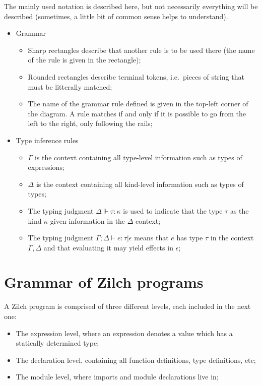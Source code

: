The mainly used notation is described here, but not necessarily everything will be described (sometimes, a little bit of common sense helps to understand).

\begin{itemize}
	\item Grammar
	      \begin{figure}[H]
		      \centering
	      \end{figure}
	      \begin{itemize}
		      \item Sharp rectangles describe that another rule is to be used there (the name of the rule is given in the rectangle);
		      \item Rounded rectangles describe terminal tokens, i.e.\ pieces of string that must be litterally matched;
		      \item The name of the grammar rule defined is given in the top-left corner of the diagram.
		            A rule matches if and only if it is possible to go from the left to the right, only following the rails;
	      \end{itemize}
	\item Type inference rules
	      \begin{itemize}
		      \item $\Gamma$ is the context containing all type-level information such as types of expressions;
		      \item $\Delta$ is the context containing all kind-level information such as types of types;
		      \item The typing judgment $\Delta \Vdash \tau : \kappa$ is used to indicate that the type $\tau$ as the kind $\kappa$ given information in the $\Delta$ context;
		      \item The typing judgment $\Gamma;\Delta \vdash e : \tau \vert \epsilon$ means that $e$ has type $\tau$ in the context $\Gamma, \Delta$ and that evaluating it may yield effects in $\epsilon$;
	      \end{itemize}
\end{itemize}

\chapter{Grammar of Zilch programs}\label{chap:zilch-grammar}

A Zilch program is comprised of three different levels, each included in the next one:
\begin{itemize}
	\item The expression level, where an expression denotes a value which has a statically determined type;
	\item The declaration level, containing all function definitions, type definitions, etc;
	\item The module level, where imports and module declarations live in;
\end{itemize}

